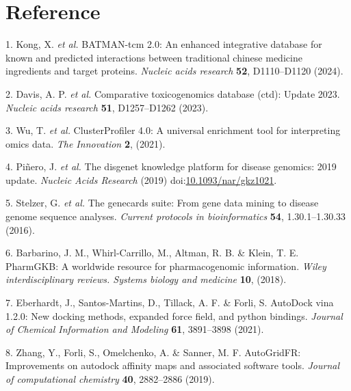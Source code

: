 \documentclass[
]{article}
\newenvironment{cslreferences}%
  {}%
  {\par}
\begin{document}
\hypertarget{bibliography}{%
\section*{Reference}\label{bibliography}}

\hypertarget{refs}{}
\begin{cslreferences}
\leavevmode\hypertarget{ref-BatmanTcm20Kong2024}{}%
1. Kong, X. \emph{et al.} BATMAN-tcm 2.0: An enhanced integrative database for known and predicted interactions between traditional chinese medicine ingredients and target proteins. \emph{Nucleic acids research} \textbf{52}, D1110--D1120 (2024).

\leavevmode\hypertarget{ref-ComparativeToxDavis2023}{}%
2. Davis, A. P. \emph{et al.} Comparative toxicogenomics database (ctd): Update 2023. \emph{Nucleic acids research} \textbf{51}, D1257--D1262 (2023).

\leavevmode\hypertarget{ref-ClusterprofilerWuTi2021}{}%
3. Wu, T. \emph{et al.} ClusterProfiler 4.0: A universal enrichment tool for interpreting omics data. \emph{The Innovation} \textbf{2}, (2021).

\leavevmode\hypertarget{ref-TheDisgenetKnPinero2019}{}%
4. Piñero, J. \emph{et al.} The disgenet knowledge platform for disease genomics: 2019 update. \emph{Nucleic Acids Research} (2019) doi:\href{https://doi.org/10.1093/nar/gkz1021}{10.1093/nar/gkz1021}.

\leavevmode\hypertarget{ref-TheGenecardsSStelze2016}{}%
5. Stelzer, G. \emph{et al.} The genecards suite: From gene data mining to disease genome sequence analyses. \emph{Current protocols in bioinformatics} \textbf{54}, 1.30.1--1.30.33 (2016).

\leavevmode\hypertarget{ref-PharmgkbAWorBarbar2018}{}%
6. Barbarino, J. M., Whirl-Carrillo, M., Altman, R. B. \& Klein, T. E. PharmGKB: A worldwide resource for pharmacogenomic information. \emph{Wiley interdisciplinary reviews. Systems biology and medicine} \textbf{10}, (2018).

\leavevmode\hypertarget{ref-AutodockVina1Eberha2021}{}%
7. Eberhardt, J., Santos-Martins, D., Tillack, A. F. \& Forli, S. AutoDock vina 1.2.0: New docking methods, expanded force field, and python bindings. \emph{Journal of Chemical Information and Modeling} \textbf{61}, 3891--3898 (2021).

\leavevmode\hypertarget{ref-AutogridfrImpZhang2019}{}%
8. Zhang, Y., Forli, S., Omelchenko, A. \& Sanner, M. F. AutoGridFR: Improvements on autodock affinity maps and associated software tools. \emph{Journal of computational chemistry} \textbf{40}, 2882--2886 (2019).


\end{cslreferences}
\end{document}
